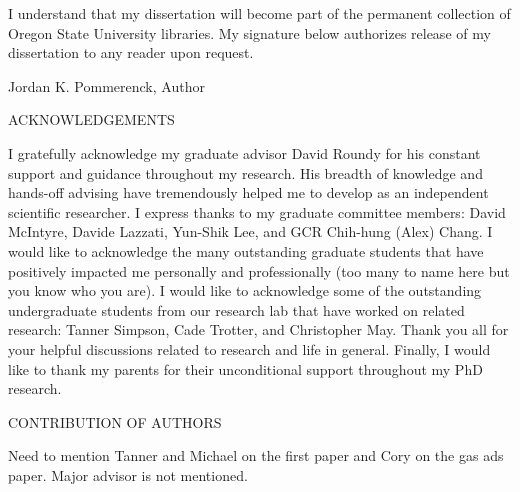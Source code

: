 \vspace{3.0cm}
\justify{}
I understand that my dissertation will become part of the permanent collection
of Oregon State University libraries. My signature below authorizes release of my dissertation to any reader upon request. \\
\vspace{0.5cm}
\begin{flushleft}
\underline{\hspace{15cm}}
\end{flushleft}
\centering{}
Jordan K. Pommerenck, Author

\newpage{}
\thispagestyle{empty}
\begin{center}
	\large
	ACKNOWLEDGEMENTS
\end{center}
\justify{}
\doublespacing
I gratefully acknowledge my graduate advisor David Roundy for his
constant support and guidance throughout my research. His breadth of knowledge
and hands-off advising have tremendously helped me to develop as an independent scientific researcher. I express thanks to my graduate committee members: David McIntyre, Davide Lazzati, Yun-Shik Lee, and GCR Chih-hung (Alex) Chang.
I would like to acknowledge the many outstanding graduate students that have positively impacted me personally and professionally (too many to name here but you know who you are). I would like to acknowledge some of the outstanding undergraduate students from our research lab that have worked on related research: Tanner Simpson, Cade Trotter, and Christopher May. Thank you all for your helpful discussions related to research and life in general. Finally, I would like to thank my parents for their unconditional support throughout my PhD research.

\newpage{}
\thispagestyle{empty}
\begin{center}
	\large
	CONTRIBUTION OF AUTHORS
\end{center}
\justify{}
\doublespacing
Need to mention Tanner and Michael on the first paper and Cory on the gas ads paper. Major advisor is not mentioned.
